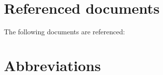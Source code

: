 \documentclass[a4paper, oneside, 11pt, article, english]{memoir}
\begin{document}
\begin{table}[htbp]
\begin{threeparttable}
\begin{tabular}{@{}lll@{}}
      \bottomrule
    \end{tabular}
    \begin{tablenotes}
    \end{tablenotes}
  \end{threeparttable}
\end{table}


\section{Referenced documents}
\label{sec:docs}


The following documents are referenced:

\begin{description}
  \firmlist
\end{description}


\section{Abbreviations}
\label{sec:abbrev}

\end{document}
